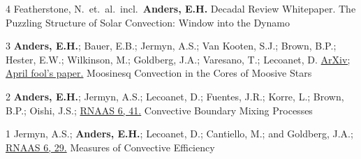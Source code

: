 \vspace{0.3cm}
	  {4}
	  {
		Featherstone, N.~et.~al.~incl.~\textbf{Anders, E.H.}
        Decadal Review Whitepaper. 
	  }
	  {
            The Puzzling Structure of Solar Convection: Window into the Dynamo
      }


\cvpub{}
	  {3}
	  {
		\textbf{Anders, E.H.}; Bauer, E.B.; Jermyn, A.S.; Van Kooten, S.J.; Brown, B.P.; Hester, E.W.; Wilkinson, M.; Goldberg, J.A.; Varesano, T.; Lecoanet, D.
        \href{https://arxiv.org/abs/2204.00002}{ArXiv; April fool's paper.}
	  }
	  {Moosinesq Convection in the Cores of Moosive Stars}

\cvpub{}
	  {2}
	  {
		\textbf{Anders, E.H.}; Jermyn, A.S.; Lecoanet, D.; Fuentes, J.R.; Korre, L.; Brown, B.P.; Oishi, J.S.; 
        \href{https://iopscience.iop.org/article/10.3847/2515-5172/ac5892}{RNAAS 6, 41.}
	  }
	  {Convective Boundary Mixing Processes}

\cvpub{}
	  {1}
	  {
		Jermyn, A.S.; \textbf{Anders, E.H.}; Lecoanet, D.; Cantiello, M.; and Goldberg, J.A.; 
        \href{https://iopscience.iop.org/article/10.3847/2515-5172/ac531e}{RNAAS 6, 29.}
	  }
	  {Measures of Convective Efficiency}


